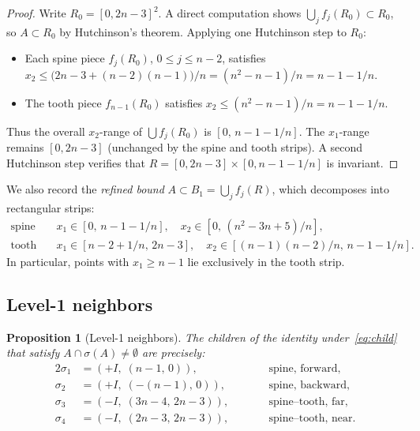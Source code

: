 \documentclass{amsart}
\newtheorem{proposition}[theorem]{Proposition}
\theoremstyle{definition}
\theoremstyle{remark}
\begin{document}
\begin{proof}
Write $R_0 = [0, 2n{-}3]^2$.  A direct computation shows
$\bigcup_j f_j(R_0) \subset R_0$, so $A \subset R_0$ by
Hutchinson's theorem.  Applying one Hutchinson step to $R_0$:
\begin{itemize}
\item Each spine piece $f_j(R_0)$, $0 \le j \le n{-}2$, satisfies
  $x_2 \le \bigl(2n{-}3 + (n{-}2)(n{-}1)\bigr)/n
  = (n^2{-}n{-}1)/n = n{-}1{-}1/n$.
\item The tooth piece $f_{n-1}(R_0)$ satisfies
  $x_2 \le (n^2{-}n{-}1)/n = n{-}1{-}1/n$.
\end{itemize}
Thus the overall $x_2$-range of $\bigcup f_j(R_0)$ is $[0,\, n{-}1{-}1/n]$.
The $x_1$-range remains $[0, 2n{-}3]$ (unchanged by the spine
and tooth strips).  A second Hutchinson step verifies that
$R = [0, 2n{-}3] \times [0, n{-}1{-}1/n]$ is invariant.
\end{proof}

We also record the \emph{refined bound}
$A \subset B_1 = \bigcup_j f_j(R)$, which decomposes into rectangular
strips:
\begin{equation}\label{eq:B1-strips}
\begin{aligned}
  \text{spine strip:}\quad & x_1 \in [0,\, n{-}1{-}1/n], \quad
    x_2 \in [0,\, (n^2{-}3n{+}5)/n], \\
  \text{tooth strip:}\quad & x_1 \in [n{-}2{+}1/n,\, 2n{-}3], \quad
    x_2 \in [(n{-}1)(n{-}2)/n,\, n{-}1{-}1/n].
\end{aligned}
\end{equation}
In particular, points with $x_1 \ge n{-}1$ lie exclusively in the
tooth strip.

\subsection{Level-1 neighbors}

\begin{proposition}[Level-1 neighbors]\label{prop:level1}
The children of the identity under~\eqref{eq:child} that satisfy
$A \cap \sigma(A) \ne \emptyset$ are precisely:
\begin{alignat*}{2}
  \sigma_1 &= (+I,\; (n{-}1,\, 0)),
    &\qquad& \text{spine, forward}, \\
  \sigma_2 &= (+I,\; (-(n{-}1),\, 0)),
    &\qquad& \text{spine, backward}, \\
  \sigma_3 &= (-I,\; (3n{-}4,\, 2n{-}3)),
    &\qquad& \text{spine--tooth, far}, \\
  \sigma_4 &= (-I,\; (2n{-}3,\, 2n{-}3)),
    &\qquad& \text{spine--tooth, near}.
\end{alignat*}
\end{proposition}
\end{document}
